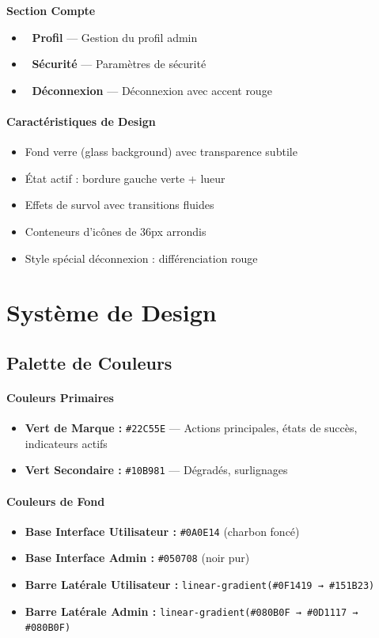 \documentclass[12pt, a4paper]{report}
\begin{document}
\textbf{Section Compte}
\begin{itemize}
    \item 👤 \textbf{Profil} --- Gestion du profil admin
    \item 🔐 \textbf{Sécurité} --- Paramètres de sécurité
    \item 🚪 \textbf{Déconnexion} --- Déconnexion avec accent rouge
\end{itemize}

\paragraph{Caractéristiques de Design}
\begin{itemize}
    \item Fond verre (glass background) avec transparence subtile
    \item État actif : bordure gauche verte + lueur
    \item Effets de survol avec transitions fluides
    \item Conteneurs d'icônes de 36px arrondis
    \item Style spécial déconnexion : différenciation rouge
\end{itemize}

\section{Système de Design}

\subsection{Palette de Couleurs}

\paragraph{Couleurs Primaires}
\begin{itemize}
    \item \textbf{Vert de Marque :} \texttt{\#22C55E} --- Actions principales, états de succès, indicateurs actifs
    \item \textbf{Vert Secondaire :} \texttt{\#10B981} --- Dégradés, surlignages
\end{itemize}

\paragraph{Couleurs de Fond}
\begin{itemize}
    \item \textbf{Base Interface Utilisateur :} \texttt{\#0A0E14} (charbon foncé)
    \item \textbf{Base Interface Admin :} \texttt{\#050708} (noir pur)
    \item \textbf{Barre Latérale Utilisateur :} \texttt{linear-gradient(\#0F1419 → \#151B23)}
    \item \textbf{Barre Latérale Admin :} \texttt{linear-gradient(\#080B0F → \#0D1117 → \#080B0F)}
\end{itemize}
\end{document}
